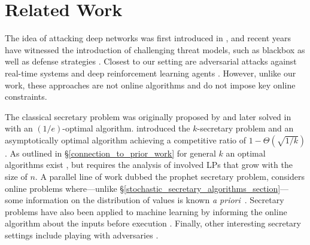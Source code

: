 \section{Related Work}

 The idea of attacking deep networks was first introduced in \citep{szegedy2013intriguing,goodfellow2014explaining}, and recent years have witnessed the introduction of challenging threat models, such as blackbox \cite{chen2017zoo,ilyas2018black, jiang2019black,bose2020adversarial,chakraborty2018adversarial} as well as defense strategies \cite{madry2017towards,tramer2017ensemble,Ding2020MMA}.
Closest to our setting are adversarial attacks against real-time systems \cite{gong2019real, gong2019remasc} and deep reinforcement learning agents \cite{lin2017tactics,sun2020stealthy}. However, unlike our work, these approaches are not online algorithms and do not impose key online constraints.

 The classical secretary problem was originally proposed by \cite{gardner1960mathematical} and later solved in \cite{dynkin1963optimum} with an $(1/e)$-optimal algorithm. \citet{kleinberg2005multiple} introduced the $k$-secretary problem and an asymptotically optimal algorithm achieving a competitive ratio of $1 - \Theta(\sqrt{1/k})$. 
As outlined in \S\ref{connection_to_prior_work} for general $k$ an optimal algorithms exist \cite{chan2014revealing}, but requires the analysis of involved LPs that grow with the size of $n$. A parallel line of work dubbed the prophet secretary problem, considers online problems where---unlike \S\ref{stochastic_secretary_algorithms_section}---some information on the distribution of values is known \textit{a priori}~\cite{azar2014prophet, azar2018prophet, esfandiari2017prophet}. Secretary problems have also been applied to machine learning by informing the online algorithm about the inputs before execution \cite{antoniadis2020secretary,dutting2020secretaries}. 
Finally, other interesting secretary settings include playing with adversaries \cite{bradac2019robust, kaplan2020competitive}.




